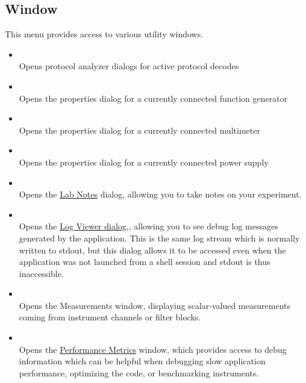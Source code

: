 \subsection{Window}

This menu provides access to various utility windows.

\begin{itemize}

\item {}\\
Opens protocol analyzer dialogs for active protocol decodes

\item {}\\
Opens the properties dialog for a currently connected function generator

\item {}\\
Opens the properties dialog for a currently connected multimeter

\item {}\\
Opens the properties dialog for a currently connected power supply

\item {}\\
Opens the \hyperref[dlg:labnotes]{Lab Notes} dialog, allowing you to take notes on your experiment.

\item {}\\
Opens the \hyperref[dlg:logviewer]{Log Viewer dialog,},  allowing you to see debug log messages generated by the
application. This is the same log stream which is normally written to stdout, but this dialog allows it to be accessed
even when the application was not launched from a shell session and stdout is thus inaccessible.

\item {}\\
Opens the Measurements window, displaying scalar-valued measurements coming from instrument channels or filter blocks.

\item {}\\
Opens the \hyperref[dlg:perfemetrics]{Performance Metrics} window, which provides access to debug information which can
be helpful when debugging slow application performance, optimizing the code, or benchmarking instruments.


\end{itemize}
